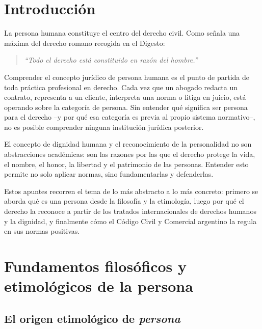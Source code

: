\documentclass[12pt,oneside]{book}
\begin{document}
\chapter*{Introducción}

La persona humana constituye el centro del derecho civil. Como señala una máxima del derecho romano recogida en el Digesto:

\begin{quote}
\textit{``Todo el derecho está constituido en razón del hombre.''}
\end{quote}

Comprender el concepto jurídico de persona humana es el punto de partida de toda práctica profesional en derecho. Cada vez que un abogado redacta un contrato, representa a un cliente, interpreta una norma o litiga en juicio, está operando sobre la categoría de persona. Sin entender qué significa ser persona para el derecho --y por qué esa categoría es previa al propio sistema normativo--, no es posible comprender ninguna institución jurídica posterior.

El concepto de dignidad humana y el reconocimiento de la personalidad no son abstracciones académicas: son las razones por las que el derecho protege la vida, el nombre, el honor, la libertad y el patrimonio de las personas. Entender esto permite no solo aplicar normas, sino fundamentarlas y defenderlas.

Estos apuntes recorren el tema de lo más abstracto a lo más concreto: primero se aborda qué es una persona desde la filosofía y la etimología, luego por qué el derecho la reconoce a partir de los tratados internacionales de derechos humanos y la dignidad, y finalmente cómo el Código Civil y Comercial argentino la regula en sus normas positivas.

\chapter{Fundamentos filosóficos y etimológicos de la persona}

\section{El origen etimológico de \emph{persona}}
\end{document}
